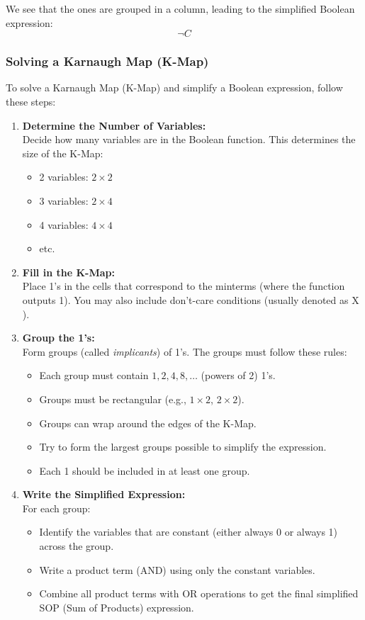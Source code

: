 We see that the ones are grouped in a column, leading to the simplified Boolean expression:
\[
	\neg C
\]

\subsubsection{Solving a Karnaugh Map (K-Map)}

To solve a Karnaugh Map (K-Map) and simplify a Boolean expression, follow these steps:

\begin{enumerate}
	\item \textbf{Determine the Number of Variables:} \\
	      Decide how many variables are in the Boolean function. This determines the size of the K-Map:
	      \begin{itemize}[label=\(-\)]
		      \item 2 variables: \(2 \times 2\)
		      \item 3 variables: \(2 \times 4\)
		      \item 4 variables: \(4 \times 4\)
		      \item etc.
	      \end{itemize}

	\item \textbf{Fill in the K-Map:} \\
	      Place 1's in the cells that correspond to the minterms (where the function outputs 1). You may also include don't-care conditions (usually denoted as \(\)X\(\)).

	\item \textbf{Group the 1's:} \\
	      Form groups (called \emph{implicants}) of 1's. The groups must follow these rules:
	      \begin{itemize}[label=\(-\)]
		      \item Each group must contain \(1, 2, 4, 8, \ldots\) (powers of 2) 1's.
		      \item Groups must be rectangular (e.g., \(1 \times 2\), \(2 \times 2\)).
		      \item Groups can wrap around the edges of the K-Map.
		      \item Try to form the largest groups possible to simplify the expression.
		      \item Each 1 should be included in at least one group.
	      \end{itemize}

	\item \textbf{Write the Simplified Expression:} \\
	      For each group:
	      \begin{itemize}[label=\(-\)]
		      \item Identify the variables that are constant (either always 0 or always 1) across the group.
		      \item Write a product term (AND) using only the constant variables.
		      \item Combine all product terms with OR operations to get the final simplified SOP (Sum of Products) expression.
	      \end{itemize}
\end{enumerate}


